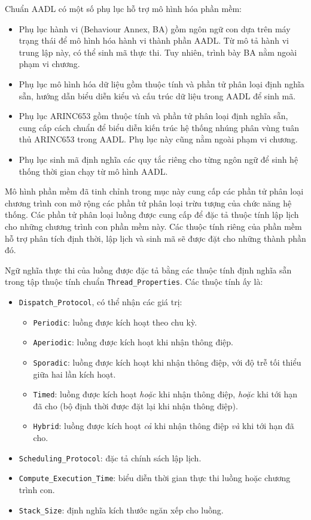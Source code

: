 Chuẩn AADL có một số phụ lục hỗ trợ mô hình hóa phần mềm:
\begin{itemize}
\item Phụ lục hành vi (Behaviour Annex, BA) gồm ngôn ngữ con dựa trên máy trạng thái để mô hình hóa hành vi thành phần AADL. Từ mô tả hành vi trung lập này, có thể sinh mã thực thi. Tuy nhiên, trình bày BA nằm ngoài phạm vi chương.
\item Phụ lục mô hình hóa dữ liệu gồm thuộc tính và phần tử phân loại định nghĩa sẵn, hướng dẫn biểu diễn kiểu và cấu trúc dữ liệu trong AADL để sinh mã.
\item Phụ lục ARINC653 gồm thuộc tính và phần tử phân loại định nghĩa sẵn, cung cấp cách chuẩn để biểu diễn kiến trúc hệ thống nhúng phân vùng tuân thủ ARINC653 trong AADL. Phụ lục này cũng nằm ngoài phạm vi chương.
\item Phụ lục sinh mã định nghĩa các quy tắc riêng cho từng ngôn ngữ để sinh hệ thống thời gian chạy từ mô hình AADL.
\end{itemize}

Mô hình phần mềm đã tinh chỉnh trong mục này cung cấp các phần tử phân loại chương trình con mở rộng các phần tử phân loại trừu tượng của chức năng hệ thống. Các phần tử phân loại luồng được cung cấp để đặc tả thuộc tính lập lịch cho những chương trình con phần mềm này. Các thuộc tính riêng của phần mềm hỗ trợ phân tích định thời, lập lịch và sinh mã sẽ được đặt cho những thành phần đó.

Ngữ nghĩa thực thi của luồng được đặc tả bằng các thuộc tính định nghĩa sẵn trong tập thuộc tính chuẩn \texttt{Thread\_Properties}. Các thuộc tính ấy là:
\begin{itemize}
\item \texttt{Dispatch\_Protocol}, có thể nhận các giá trị:
\begin{itemize}
\item \texttt{Periodic}: luồng được kích hoạt theo chu kỳ.
\item \texttt{Aperiodic}: luồng được kích hoạt khi nhận thông điệp.
\item \texttt{Sporadic}: luồng được kích hoạt khi nhận thông điệp, với độ trễ tối thiểu giữa hai lần kích hoạt.
\item \texttt{Timed}: luồng được kích hoạt \emph{hoặc} khi nhận thông điệp, \emph{hoặc} khi tới hạn đã cho (bộ định thời được đặt lại khi nhận thông điệp).
\item \texttt{Hybrid}: luồng được kích hoạt \emph{cả} khi nhận thông điệp \emph{và} khi tới hạn đã cho.
\end{itemize}
\item \texttt{Scheduling\_Protocol}: đặc tả chính sách lập lịch.
\item \texttt{Compute\_Execution\_Time}: biểu diễn thời gian thực thi luồng hoặc chương trình con.
\item \texttt{Stack\_Size}: định nghĩa kích thước ngăn xếp cho luồng.
\end{itemize}

